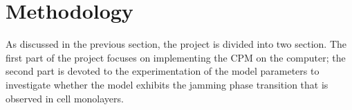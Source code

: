 \documentclass[a4paper,12pt]{article}
\begin{document}
%
%
%

\section{Methodology}
As discussed in the previous section, the project is divided into two section. The first part of the project focuses on implementing the CPM on the computer; the second part is devoted to the experimentation of the model parameters to investigate whether the model exhibits the jamming phase transition that is observed in cell monolayers.
\end{document}
